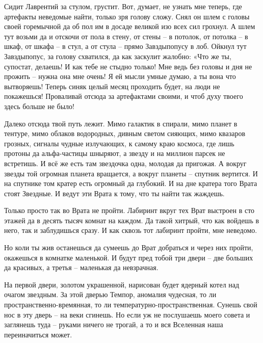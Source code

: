 \documentclass[ebook,oneside,final,openright]{memoir}
\begin{document}
\par
Сидит Лаврентий за стулом, грустит. Вот, думает, не узнать мне теперь, где артефакты неведомые найти, только зря голову сложу. Снял он шлем с головы своей горемычной да об пол им в досаде великой изо всех сил грохнул. А шлем тут возьми да и отскочи от пола в стену, от стены – в потолок, от потолка – в шкаф, от шкафа – в стул, а от стула – прямо Завздыпопусу в лоб. Ойкнул тут Завздыпопус, за голову схватился, да как заскулит жалобно: «Что же ты, супостат, делаешь! И как тебе не стыдно только! Мне ведь без головы и дня не прожить – нужна она мне очень! Я ей мысли умные думаю, а ты вона что вытворяешь! Теперь синяк целый месяц проходить будет, на люди не покажешься! Проваливай отсюда за артефактами своими, и чтоб духу твоего здесь больше не было!\par
\par
Далеко отсюда твой путь лежит. Мимо галактик в спирали, мимо планет в тентуре, мимо облаков водородных, дивным светом сияющих, мимо квазаров грозных, сигналы чудные излучающих, к самому краю космоса, где лишь протоны да альфа-частицы шныряют, а звезду и на миллион парсек не встретишь. И всё же есть там звездочка одна, молодая да пригожая. А вокруг звезды той огромная планета вращается, а вокруг планеты – спутник вертится. И на спутнике том кратер есть огромный да глубокий. И на дне кратера того Врата стоят Звездные. И ведут эти Врата к тому, что ты найти так жаждешь.\par
\par
Только просто так во Врата не пройти. Лабиринт вкруг тех Врат выстроен в сто этажей да в десять тысяч комнат на каждом. Да такой хитрый, что как войдешь в него, так и заблудишься сразу. И как сквозь тот лабиринт пройти, мне неведомо.\par
\par
Но коли ты жив останешься да сумеешь до Врат добраться и через них пройти, окажешься в комнатке маленькой. И будут пред тобой три двери – две больших да красивых, а третья – маленькая да невзрачная.\par
\par
На первой двери, золотом украшенной, нарисован будет ядерный котел над очагом звездным. За этой дверью Темпор, аномалия чудесная, то ли пространственно-времянная, то ли температурно-пространственная. Сунешь свой нос в эту дверь – на веки сгинешь. Но если уж не послушаешь моего совета и заглянешь туда – руками ничего не трогай, а то и вся Вселенная наша переиначиться может.\par
\par
\end{document}
